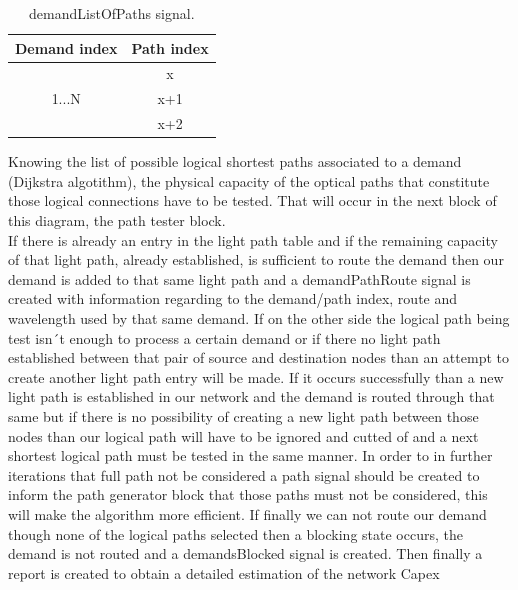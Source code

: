 \begin{table}[H]
		\centering
	\begin{tabular}{|c|c|l|l|}
		\hline
		Demand index           & \multicolumn{3}{c|}{Path index} \\ \hline
		\multirow{3}{*}{1...N} & \multicolumn{3}{c|}{x}          \\ \cline{2-4} 
		& \multicolumn{3}{c|}{x+1}        \\ \cline{2-4} 
		& \multicolumn{3}{c|}{x+2}        \\ \hline
	\end{tabular}
	\caption{demandListOfPaths signal.}
	\label{demandListOfPaths_example}
\end{table}
Knowing the list of possible logical shortest paths associated to a demand (Dijkstra algotithm), the physical capacity of the optical paths that constitute those logical connections have to be tested. That will occur in the next block of this diagram, the path tester block.\\
If there is already an entry in the light path table and if the remaining capacity of that light path, already established, is sufficient to route the demand then our demand is added to that same light path and a demandPathRoute signal is created with information regarding to the demand/path index, route and wavelength used by that same demand. If on the other side the logical path being test isn´t enough to process a certain demand or if there no light path established between that pair of source and destination nodes than an attempt to create another light path entry will be made. If it occurs successfully than a new light path is established in our network and the demand is routed through that same but if there is no possibility of creating a new light path between those nodes than our logical path will have to be ignored and cutted of and a next shortest logical path must be tested in the same manner. In order to in further iterations that full path not be considered a path signal should be created to inform the path generator block that those paths must not be considered, this will make the algorithm more efficient. If finally we can not route our demand though none of the logical paths selected then a blocking state occurs, the demand is not routed and a demandsBlocked signal is created. Then finally a report is created to obtain a detailed estimation of the network Capex
